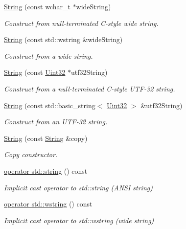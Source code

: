 \begin{DoxyCompactItemize}
\hyperlink{classburn_1_1_string_af4715424b8beb05efa209a332e2ffd77}{String} (const wchar\-\_\-t $\ast$wide\-String)
\begin{DoxyCompactList}\small\item\em Construct from null-\/terminated C-\/style wide string. \end{DoxyCompactList}\item 
\hyperlink{classburn_1_1_string_a40658c80f170163c4b7294d36c4e458c}{String} (const std\-::wstring \&wide\-String)
\begin{DoxyCompactList}\small\item\em Construct from a wide string. \end{DoxyCompactList}\item 
\hyperlink{classburn_1_1_string_aed7c164cd06ccd741917dcfb717dfdd3}{String} (const \hyperlink{namespaceburn_ab40b09022209bd449d317c1f0e95356b}{Uint32} $\ast$utf32\-String)
\begin{DoxyCompactList}\small\item\em Construct from a null-\/terminated C-\/style U\-T\-F-\/32 string. \end{DoxyCompactList}\item 
\hyperlink{classburn_1_1_string_a6352b76b09fb99657b2a56f557941596}{String} (const std\-::basic\-\_\-string$<$ \hyperlink{namespaceburn_ab40b09022209bd449d317c1f0e95356b}{Uint32} $>$ \&utf32\-String)
\begin{DoxyCompactList}\small\item\em Construct from an U\-T\-F-\/32 string. \end{DoxyCompactList}\item 
\hyperlink{classburn_1_1_string_a77d71a82e074ec6a48087026aadfa36d}{String} (const \hyperlink{classburn_1_1_string}{String} \&copy)
\begin{DoxyCompactList}\small\item\em Copy constructor. \end{DoxyCompactList}\item 
\hyperlink{classburn_1_1_string_a1b2475781bec48ff43e28e986cb2eed8}{operator std\-::string} () const 
\begin{DoxyCompactList}\small\item\em Implicit cast operator to std\-::string (A\-N\-S\-I string) \end{DoxyCompactList}\item 
\hyperlink{classburn_1_1_string_aaf1ce104de7a958b6ed9575fb10e5c9f}{operator std\-::wstring} () const 
\begin{DoxyCompactList}\small\item\em Implicit cast operator to std\-::wstring (wide string) \end{DoxyCompactList}\item 

\end{DoxyCompactItemize}
